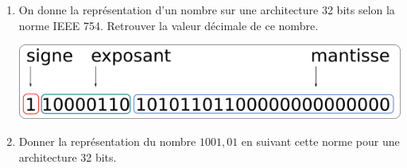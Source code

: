 \documentclass[11pt,a4paper]{article}
\newcounter{num}
\begin{document}
\begin{enumerate}

\item On donne la représentation d'un nombre sur une architecture 32 bits selon la norme IEEE 754. Retrouver la valeur décimale de ce nombre.

\begin{center}
\includegraphics[scale=0.8]{../img/flottant_2.png}
\end{center}

\item Donner la représentation du nombre $1001,01$ en suivant cette norme pour une architecture 32 bits.


\end{enumerate}
\end{document}
